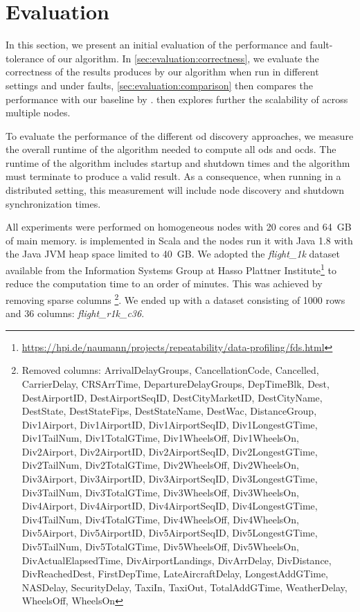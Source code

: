 
\section{Evaluation}\label{sec:evaluation}

  In this section, we present an initial evaluation of the performance and fault-tolerance of our algorithm.
  In \cref{sec:evaluation:correctness}, we evaluate the correctness of the results produces by our algorithm when run in different settings and under faults, \cref{sec:evaluation:comparison} then compares the performance with our baseline \ocddiscover{} by \citeauthor{consonni}.
   then explores further the scalability of \dodo{} across multiple nodes.

  To evaluate the performance of the different \gls{od} discovery approaches, we measure the overall runtime of the algorithm needed to compute all \glspl{od} and \glspl{ocd}.
  The runtime of the algorithm includes startup and shutdown times and the algorithm must terminate to produce a valid result.
  As a consequence, when running \dodo{} in a distributed setting, this measurement will include node discovery and shutdown synchronization times.

  All experiments were performed on homogeneous nodes with 20 cores and 64~GB of main memory.
  \dodo{} is implemented in Scala and the nodes run it with Java 1.8 with the Java JVM heap space limited to 40~GB.
  We adopted the \textit{flight\_1k} dataset available from the Information Systems Group at Hasso Plattner Institute\footnote{\url{https://hpi.de/naumann/projects/repeatability/data-profiling/fds.html}} to reduce the computation time to an order of minutes.
  This was achieved by removing sparse columns%
  \footnote{Removed columns: ArrivalDelayGroups, CancellationCode, Cancelled, CarrierDelay, CRSArrTime, DepartureDelayGroups, DepTimeBlk, Dest, DestAirportID, DestAirportSeqID, DestCityMarketID, DestCityName, DestState, DestStateFips, DestStateName, DestWac, DistanceGroup, Div1Airport, Div1AirportID, Div1AirportSeqID, Div1LongestGTime, Div1TailNum, Div1TotalGTime, Div1WheelsOff, Div1WheelsOn, Div2Airport, Div2AirportID, Div2AirportSeqID, Div2LongestGTime, Div2TailNum, Div2TotalGTime, Div2WheelsOff, Div2WheelsOn, Div3Airport, Div3AirportID, Div3AirportSeqID, Div3LongestGTime, Div3TailNum, Div3TotalGTime, Div3WheelsOff, Div3WheelsOn, Div4Airport, Div4AirportID, Div4AirportSeqID, Div4LongestGTime, Div4TailNum, Div4TotalGTime, Div4WheelsOff, Div4WheelsOn, Div5Airport, Div5AirportID, Div5AirportSeqID, Div5LongestGTime, Div5TailNum, Div5TotalGTime, Div5WheelsOff, Div5WheelsOn, DivActualElapsedTime, DivAirportLandings, DivArrDelay, DivDistance, DivReachedDest, FirstDepTime, LateAircraftDelay, LongestAddGTime, NASDelay, SecurityDelay, TaxiIn, TaxiOut, TotalAddGTime, WeatherDelay, WheelsOff, WheelsOn}.
  We ended up with a dataset consisting of 1000 rows and 36 columns: \textit{flight\_r1k\_c36}.


